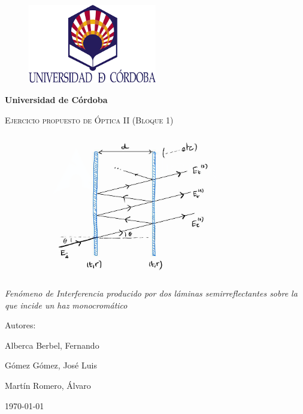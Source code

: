 \documentclass[a4paper]{article}
\begin{document}
\begin{titlepage}
\centering
\begin{figure}[H]
	\centering
	\includegraphics[width=0.5\textwidth]{uco.png}
\end{figure}
{\bfseries\LARGE Universidad de Córdoba \par}
\vspace{1cm}
{\scshape\Large Ejercicio propuesto de Óptica II (Bloque 1) \par}
\vspace{0.5cm}
\begin{figure}[H]
	\centering
	\includegraphics[width=0.8\textwidth]{diagrama.png}
	
	\label{fig:}
\end{figure}
\vspace{0cm}
{\itshape\Large Fenómeno de Interferencia producido por dos láminas semirreflectantes sobre la que incide un haz monocromático \par}
\vfill
{\Large Autores: \par}
{\Large Alberca Berbel, Fernando \par
Gómez Gómez, José Luis \par
Martín Romero, Álvaro}
\vfill
{\Large  \today \par}
\end{titlepage} 
\end{document}
